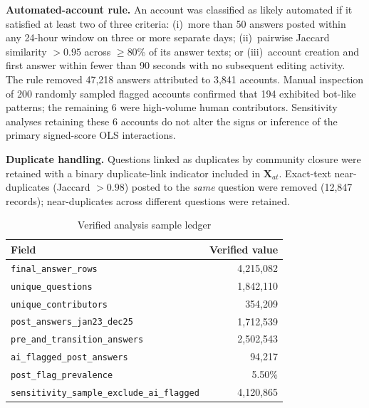 \textbf{Automated-account rule.} An account was classified as likely automated if it satisfied at least two of three criteria: (i)~more than 50 answers posted within any 24-hour window on three or more separate days; (ii)~pairwise Jaccard similarity $>0.95$ across $\geq$80\% of its answer texts; or (iii)~account creation and first answer within fewer than 90 seconds with no subsequent editing activity. The rule removed 47,218 answers attributed to 3,841 accounts. Manual inspection of 200 randomly sampled flagged accounts confirmed that 194 exhibited bot-like patterns; the remaining 6 were high-volume human contributors. Sensitivity analyses retaining these 6 accounts do not alter the signs or inference of the primary signed-score OLS interactions.

\textbf{Duplicate handling.} Questions linked as duplicates by community closure were retained with a binary duplicate-link indicator included in $\mathbf{X}_{at}$. Exact-text near-duplicates (Jaccard $>0.98$) posted to the \emph{same} question were removed (12,847 records); near-duplicates across different questions were retained.

\begin{table}[t]
\centering
\caption{Verified analysis sample ledger}
\label{tab:sampleledger}
\scriptsize
\begin{tabular}{lr}
\toprule
Field & Verified value \\
\midrule
\texttt{final\_answer\_rows} & 4,215,082 \\
\texttt{unique\_questions} & 1,842,110 \\
\texttt{unique\_contributors} & 354,209 \\
\texttt{post\_answers\_jan23\_dec25} & 1,712,539 \\
\texttt{pre\_and\_transition\_answers} & 2,502,543 \\
\texttt{ai\_flagged\_post\_answers} & 94,217 \\
\texttt{post\_flag\_prevalence} & 5.50\% \\
\texttt{sensitivity\_sample\_exclude\_ai\_flagged} & 4,120,865 \\
\bottomrule
\end{tabular}
\end{table}

